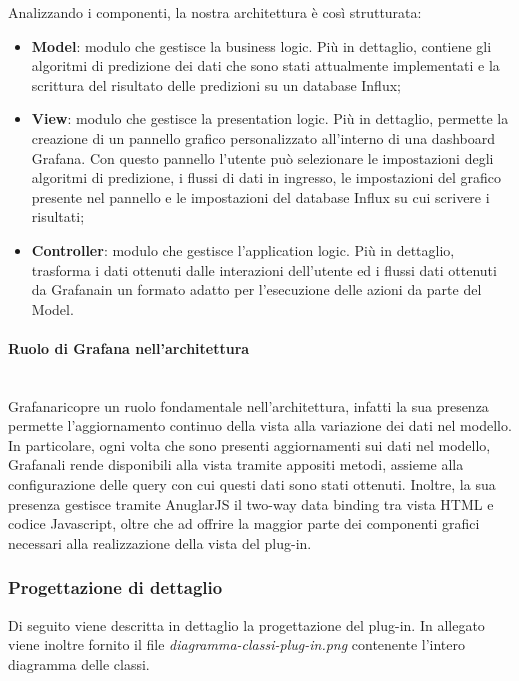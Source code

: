 Analizzando i componenti, la nostra architettura è così strutturata: 
\begin{itemize}
	\item \textbf{Model}: modulo che gestisce la business logic\glo. Più in dettaglio, contiene gli algoritmi di predizione dei dati che sono stati attualmente implementati e la scrittura del risultato delle predizioni su un database Influx;
	\item \textbf{View}: modulo che gestisce la presentation logic. Più in dettaglio, permette la creazione di un pannello grafico personalizzato all'interno di una dashboard Grafana\glo. Con questo pannello l'utente può selezionare le impostazioni degli algoritmi di predizione, i flussi di dati in ingresso, le impostazioni del grafico presente nel pannello e le impostazioni del database Influx su cui scrivere i risultati;
	\item \textbf{Controller}: modulo che gestisce l'application logic. Più in dettaglio, trasforma i dati ottenuti dalle interazioni dell'utente ed i flussi dati ottenuti da Grafana\glosp in un formato adatto per l'esecuzione delle azioni da parte del Model.
\end{itemize}
\paragraph{Ruolo di Grafana nell'architettura} \mbox{}\\ [1mm]
Grafana\glosp ricopre un ruolo fondamentale nell'architettura, infatti la sua presenza permette l'aggiornamento continuo della vista alla variazione dei dati nel modello. In particolare, ogni volta che sono presenti aggiornamenti sui dati nel modello, Grafana\glosp li rende disponibili alla vista tramite appositi metodi, assieme alla configurazione delle query con cui questi dati sono stati ottenuti. Inoltre, la sua presenza gestisce tramite AnuglarJS il two-way data binding tra vista HTML e codice Javascript, oltre che ad offrire la maggior parte dei componenti grafici necessari alla realizzazione della vista del plug-in.
\subsubsection{Progettazione di dettaglio}
Di seguito viene descritta in dettaglio la progettazione del plug-in. In allegato viene inoltre fornito il file \textit{diagramma-classi-plug-in.png} contenente l'intero diagramma delle classi.
